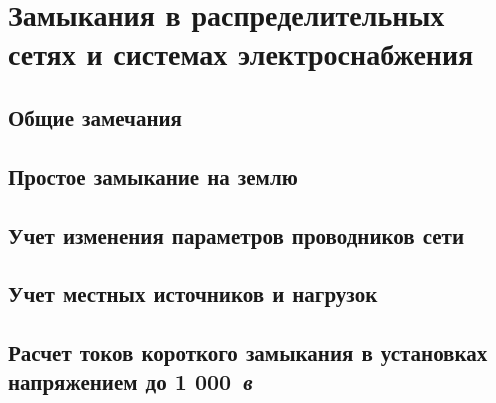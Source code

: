 \chapter{Замыкания в распределительных сетях и системах электроснабжения}
\label{chap:17}

\section{Общие замечания}
\label{sec:17-1}


\section{Простое замыкание на землю}
\label{sec:17-2}


\section{Учет изменения параметров проводников сети}
\label{sec:17-3}


\section{Учет местных источников и нагрузок}
\label{sec:17-4}


\section{Расчет токов короткого замыкания в установках напряжением до 1 000~\textit{в}}
\label{sec:17-5}